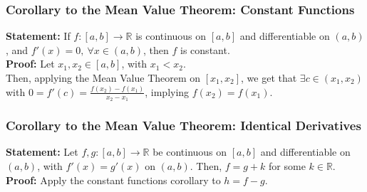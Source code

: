 \documentclass[10pt]{extarticle}
\newcommand{\R}{\mathbb{R}}
\begin{document}
  \subsubsection{Corollary to the Mean Value Theorem: Constant Functions}%
  \textbf{Statement:} If $f:[a,b]\rightarrow \R$ is continuous on $[a,b]$ and differentiable on $(a,b)$, and $f'(x) = 0,~\forall x\in (a,b)$, then $f$ is constant.\\

  \textbf{Proof:} Let $x_1, x_2\in [a,b]$, with $x_1 < x_2$.\\

  Then, applying the Mean Value Theorem on $[x_1,x_2]$, we get that $\exists c\in (x_1,x_2)$ with $0 = f'(c) = \frac{f(x_2)-f(x_1)}{x_2-x_1}$, implying $f(x_2) = f(x_1)$.
  \subsubsection{Corollary to the Mean Value Theorem: Identical Derivatives}%
  \textbf{Statement:} Let $f,g: [a,b]\rightarrow \R$ be continuous on $[a,b]$ and differentiable on $(a,b)$, with $f'(x) = g'(x)$ on $(a,b)$. Then, $f = g + k$ for some $k\in\R$.\\

  \textbf{Proof:} Apply the constant functions corollary to $h = f-g$.
\end{document}
